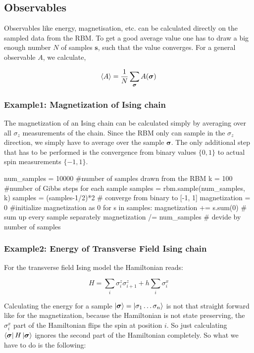 \documentclass[a4paper]{article}
\begin{document}
\subsection{Observables}

Observables like energy, magnetisation, etc. can be calculated directly on the sampled data from the RBM. To get a good average value one has to draw a big enough number $N$ of samples $\bm{s}$, such that the value converges. For a general observable $A$, we calculate,

\begin{equation}
\braket{A} = \frac{1}{N} \sum_{\bm{\sigma}} A(\bm{\sigma})
\end{equation}

\subsubsection{Example1: Magnetization of Ising chain}

The magnetization of an Ising chain can be calculated simply by averaging over all $\sigma_z$ measurements of the chain. Since the RBM only can sample in the $\sigma_z$ direction, we simply have to average over the sample $\bm{\sigma}$. The only additional step that has to be performed is the convergence from binary values $\{0,1  \}$ to actual spin measurements $\{-1 ,1  \}$.

\begin{python}
num_samples = 10000 #number of samples drawn from the RBM
k = 100 #number of Gibbs steps for each sample
samples = rbm.sample(num_samples, k)
samples = (samples-1/2)*2 # converge from binary to [-1, 1]
magnetization = 0 #initialize magnetization as 0
for s in samples: 
	magnetization += s.sum(0) # sum up every sample separately
magnetization /= num_samples # devide by number of samples
\end{python}

\subsubsection{Example2: Energy of Transverse Field Ising chain}

For the transverse field Ising model the Hamiltonian reads:

\begin{equation}
H = \sum_i \sigma^z_i \sigma^z_{i+1} + h \sum_i \sigma^x_{i}
\end{equation}

Calculating the energy for a sample $\ket{\bm{\sigma} }= \ket{\sigma_1 \dots  \sigma_n}$ is not that straight forward like for the magnetization, because the Hamiltonian is not state preserving, the $\sigma^x_i$ part of the Hamiltonian flips the spin at position $i$. So just calculating $\bra{\bm{\sigma} } H \ket{\bm{\sigma} }$ ignores the second part of the Hamiltonian completely. So what we have to do is the following:
\end{document}
